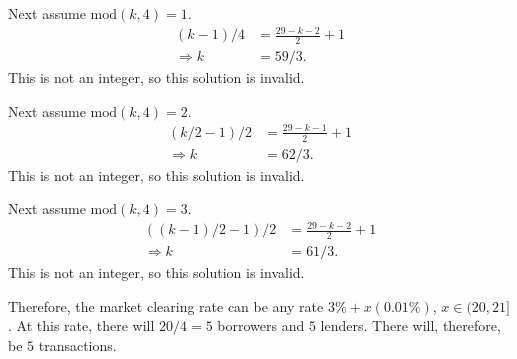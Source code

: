 \documentclass[11pt]{article} %
\begin{document}
Next assume $\text{mod}(k,4) = 1$.
\begin{align*}
(k-1)/4 &= \frac{29 - k - 2}{2} +1\\
\Rightarrow k&= 59/3.
\end{align*}
This is not an integer, so this solution is invalid.

Next assume $\text{mod}(k,4) = 2$.
\begin{align*}
(k/2 - 1)/2 &= \frac{29 - k - 1}{2} +1\\
\Rightarrow k&= 62/3.
\end{align*}
This is not an integer, so this solution is invalid.

Next assume $\text{mod}(k,4) = 3$.
\begin{align*}
((k-1)/2 -1)/2 &= \frac{29 - k - 2}{2} +1\\
\Rightarrow k &= 61/3.
\end{align*}
This is not an integer, so this solution is invalid.

Therefore, the market clearing rate can be any rate $3\%+x(0.01\%)$, $x \in (20,21]$. At this rate, there will $20/4 = 5$ borrowers and $5$ lenders. There will, therefore, be $5$ transactions.
\end{document}
